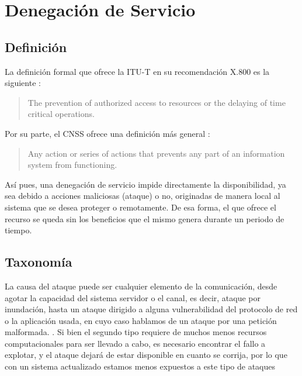 \section{Denegación de Servicio}\label{sec:Denegacion de Servicio}
\subsection{Definición}\label{ssec:dos definicion}

La definición formal que ofrece la \gls{ITU-T} en su recomendación X.800 es la siguiente \cite{ITU-T_DDoS_def}:

\begin{quote}
 The prevention of authorized access to resources or the delaying of time critical operations.
\end{quote}

Por su parte, el \gls{CNSS} ofrece una definición más general \cite{CCNS_DDoS_def}:

\begin{quote}
 Any action or series of actions that prevents any part of an information system from functioning.
\end{quote}

Así pues, una denegación de servicio impide directamente la disponibilidad, ya sea debido 
a acciones maliciosas (ataque) o no, originadas de manera local al sistema que se desea 
proteger o remotamente. De esa forma, el que ofrece el recurso se queda sin los 
beneficios que el mismo genera durante un periodo de tiempo. 

\subsection{Taxonomía}\label{ssec:dos taxonomia}

La causa del ataque puede ser cualquier elemento de la comunicación, desde agotar
la capacidad del sistema servidor o el canal, es decir, ataque por inundación,
hasta un ataque dirigido a alguna vulnerabilidad del protocolo de red o la aplicación usada,
en cuyo caso hablamos de un ataque por una petición malformada.
\cite{Raghavan}. 
Si bien el segundo tipo requiere de muchos menos recursos computacionales para
ser llevado a cabo, es necesario encontrar el fallo a explotar, y el ataque dejará de estar
disponible en cuanto se corrija, por lo que con un sistema actualizado estamos menos expuestos
a este tipo de ataques

